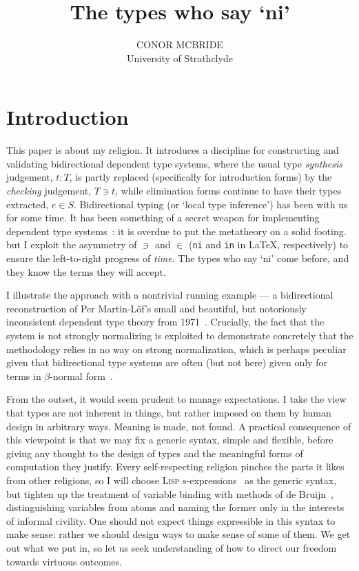 \documentclass{jfp1}
\newcommand{\bsl}{\texttt{\symbol{92}}}
\begin{document}
\title[Journal of Functional Programming]{The types who say `ni'}
\author[C. McBride]{CONOR MCBRIDE\\
  University of Strathclyde\\
  }
\maketitle

\section{Introduction}

This paper is about my religion. It introduces a discipline for
constructing and validating bidirectional dependent type systems, where the
usual type \emph{synthesis} judgement, $t : T$, is partly replaced
(specifically for introduction forms) by the \emph{checking}
judgement, $T \ni t$, while elimination forms continue to have
their types extracted, $e \in S$. Bidirectional typing (or `local
type inference') has been with us for some
time. It has been something of
a secret weapon for implementing dependent type
systems~\cite{DBLP:journals/corr/abs-1202-4905}: it is
overdue to put the metatheory on a solid footing. but I exploit the asymmetry of $\ni$ and $\in$ ({\tt \bsl ni}
and {\tt \bsl in} in \LaTeX, respectively) to ensure the
left-to-right progress of \emph{time}. The types who say `ni' come
before, and they know the terms they will accept.

I illustrate the approach with a nontrivial running example --- a bidirectional reconstruction
of Per Martin-L\"of's small and beautiful, but notoriously
inconsistent dependent type theory from
1971~\cite{martinloef:atheoryoftypes}. Crucially, the fact that the
system is not strongly normalizing is exploited to demonstrate
concretely that the methodology relies in no way on strong
normalization, which is perhaps peculiar given that bidirectional type
systems are often (but not here) given only for terms in
$\beta$-normal form~\cite{DBLP:journals/toplas/PierceT00}.

From the outset, it would seem prudent to manage expectations. I take
the view that types are not inherent in things, but rather imposed on
them by human design in arbitrary ways. Meaning is made, not
found. A practical consequence of this viewpoint is that we may
fix a generic syntax, simple and flexible, before giving any thought
to the design of types and the meaningful forms of computation they
justify. Every self-respecting religion pinches the parts it likes
from other religions, so I will choose \textsc{Lisp} s-expressions~\cite{MCCARTHY60}
as the generic syntax, but tighten up the treatment of variable
binding with methods of de Bruijn~\cite{deBruijn:dummies},
distinguishing variables from atoms and naming the former only in the
interests of informal civility. One should not expect things
expressible in this syntax to make sense: rather we should design
ways to make sense of some of them. We get out what we put
in, so let us seek understanding of how to direct our freedom towards virtuous
outcomes.
\end{document}
